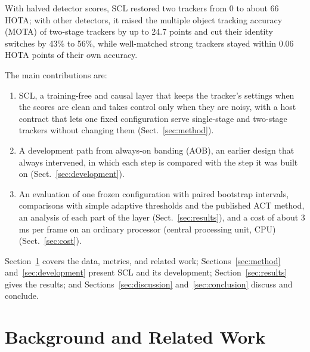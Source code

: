 \documentclass[pdflatex,sn-mathphys-num,iicol]{sn-jnl}
\newcommand{\scl}{SCL}
\newcommand{\aob}{AOB}
\begin{document}
With halved detector scores, \scl{} restored two trackers from 0 to about 66 HOTA; with other
detectors, it raised the multiple object tracking accuracy (MOTA) of two-stage trackers by up to
24.7 points and cut their identity switches by 43\% to 56\%, while well-matched strong trackers
stayed within 0.06 HOTA points of their own accuracy.

The main contributions are:
\begin{enumerate}
\item \scl{}, a training-free and causal layer that keeps the tracker's settings when the scores are
      clean and takes control only when they are noisy, with a host contract that lets one fixed
      configuration serve single-stage and two-stage trackers without changing them
      (Sect.~\ref{sec:method}).
\item A development path from always-on banding (\aob{}), an earlier design that always
      intervened, in which each step is compared with the step it was built on
      (Sect.~\ref{sec:development}).
\item An evaluation of one frozen configuration with paired bootstrap intervals, comparisons with
      simple adaptive thresholds and the published ACT method, an analysis of each part of the
      layer (Sect.~\ref{sec:results}), and a cost of about 3 ms per frame on an ordinary processor
      (central processing unit, CPU) (Sect.~\ref{sec:cost}).
\end{enumerate}

Section~\ref{sec:related} covers the data, metrics, and related work;
Sections~\ref{sec:method} and~\ref{sec:development} present \scl{} and its development;
Section~\ref{sec:results} gives the results; and Sections~\ref{sec:discussion}
and~\ref{sec:conclusion} discuss and conclude.
\section{Background and Related Work}\label{sec:related}
\end{document}
